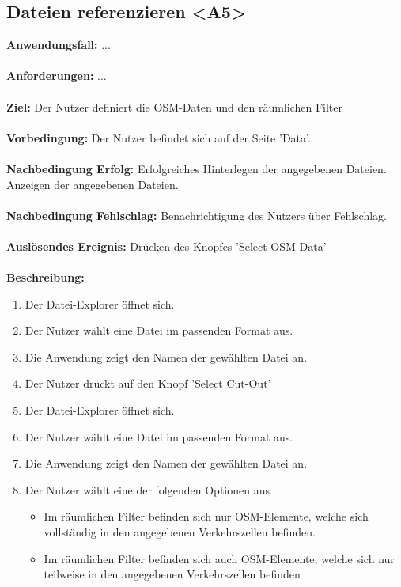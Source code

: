 \documentclass[parskip=full]{scrartcl} %
\begin{document}
\subsection*{Dateien referenzieren <A5>}
\textbf{Anwendungsfall:} ...\\\\
\textbf{Anforderungen:} ...\\\\
\textbf{Ziel:} Der Nutzer definiert die OSM-Daten und den räumlichen Filter\\\\
\textbf{Vorbedingung:} Der Nutzer befindet sich auf der Seite 'Data'. \\\\
\textbf{Nachbedingung Erfolg:} Erfolgreiches Hinterlegen der angegebenen Dateien. Anzeigen der angegebenen Dateien.\\\\
\textbf{Nachbedingung Fehlschlag:} Benachrichtigung des Nutzers über Fehlschlag. \\\\
\textbf{Auslösendes Ereignis:} Drücken des Knopfes 'Select OSM-Data'\\\\
\textbf{Beschreibung:}
\begin{enumerate}
    \item Der Datei-Explorer öffnet sich.
    \item Der Nutzer wählt eine Datei im passenden Format aus.
    \item Die Anwendung zeigt den Namen der gewählten Datei an.
    \item Der Nutzer drückt auf den Knopf 'Select Cut-Out'
    \item Der Datei-Explorer öffnet sich.
    \item Der Nutzer wählt eine Datei im passenden Format aus.
    \item Die Anwendung zeigt den Namen der gewählten Datei an.
    \item Der Nutzer wählt eine der folgenden Optionen aus
    \begin{itemize}
        \item Im räumlichen Filter befinden sich nur OSM-Elemente, welche sich vollständig in den angegebenen Verkehrszellen befinden.
        \item Im räumlichen Filter befinden sich auch OSM-Elemente, welche sich nur teilweise in den angegebenen Verkehrszellen befinden
    \end{itemize}
\end{enumerate}
\newpage
\end{document}
